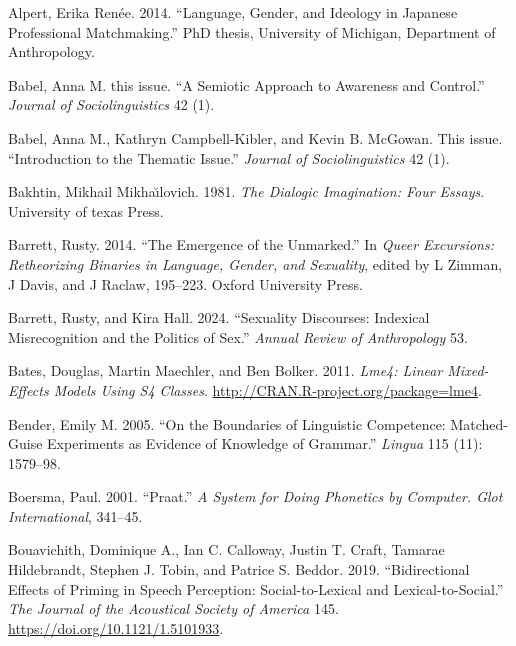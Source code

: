 \documentclass[
  letterpaper,
  DIV=11,
  numbers=noendperiod]{scrartcl}
\newlength{\cslhangindent}
\newenvironment{CSLReferences}[2] %
 {\begin{list}{}{%
  \setlength{\itemindent}{0pt}
  \setlength{\leftmargin}{0pt}
  \setlength{\parsep}{0pt}
  \ifodd #1
   \setlength{\leftmargin}{\cslhangindent}
   \setlength{\itemindent}{-1\cslhangindent}
  \fi
  \setlength{\itemsep}{#2\baselineskip}}}
 {\end{list}}
\begin{document}
\label{refs}
\begin{CSLReferences}{1}{0}
Alpert, Erika Renée. 2014. {``Language, Gender, and Ideology in Japanese
Professional Matchmaking.''} PhD thesis, University of Michigan,
Department of Anthropology.

Babel, Anna M. this issue. {``A Semiotic Approach to Awareness and
Control.''} \emph{Journal of Sociolinguistics} 42 (1).

Babel, Anna M., Kathryn Campbell-Kibler, and Kevin B. McGowan. This
issue. {``Introduction to the Thematic Issue.''} \emph{Journal of
Sociolinguistics} 42 (1).

Bakhtin, Mikhail Mikhaı̆lovich. 1981. \emph{The Dialogic Imagination:
Four Essays}. University of texas Press.

Barrett, Rusty. 2014. {``The Emergence of the Unmarked.''} In
\emph{Queer Excursions: Retheorizing Binaries in Language, Gender, and
Sexuality}, edited by L Zimman, J Davis, and J Raclaw, 195--223. Oxford
University Press.

Barrett, Rusty, and Kira Hall. 2024. {``Sexuality Discourses: Indexical
Misrecognition and the Politics of Sex.''} \emph{Annual Review of
Anthropology} 53.

Bates, Douglas, Martin Maechler, and Ben Bolker. 2011. \emph{Lme4:
Linear Mixed-Effects Models Using S4 Classes}.
\url{http://CRAN.R-project.org/package=lme4}.

Bender, Emily M. 2005. {``On the Boundaries of Linguistic Competence:
Matched-Guise Experiments as Evidence of Knowledge of Grammar.''}
\emph{Lingua} 115 (11): 1579--98.

Boersma, Paul. 2001. {``Praat.''} \emph{A System for Doing Phonetics by
Computer. {Glot} {International}}, 341--45.

Bouavichith, Dominique A., Ian C. Calloway, Justin T. Craft, Tamarae
Hildebrandt, Stephen J. Tobin, and Patrice S. Beddor. 2019.
{``Bidirectional Effects of Priming in Speech Perception:
Social-to-Lexical and Lexical-to-Social.''} \emph{The Journal of the
Acoustical Society of America} 145.
\url{https://doi.org/10.1121/1.5101933}.


\end{CSLReferences}
\end{document}
